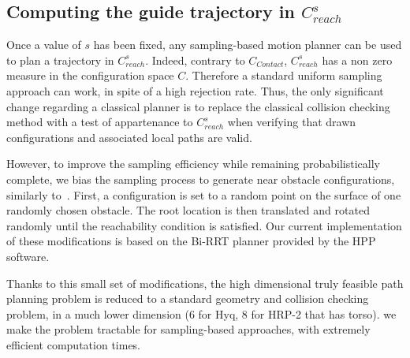 \subsection{Computing the guide trajectory in $C_{reach}^s$}
Once a value of $s$ has been fixed, any sampling-based motion planner can be used to plan a trajectory in $C_{reach}^s$. 
Indeed, contrary to $C_{Contact}$,  $C_{reach}^s$ has a non zero measure in the configuration space $C$. Therefore a standard uniform sampling approach
can work, in spite of a high rejection rate. 
Thus, the only significant change regarding a classical planner is to replace the classical collision checking method with a test of appartenance to $C_{reach}^s$ when verifying
that drawn configurations and associated local paths are valid.

However, to improve the sampling efficiency while remaining probabilistically complete, we bias the sampling process to generate near obstacle configurations, similarly to~\cite{Amato98choosinggood}.
First, a configuration is set to a random point on the surface of one randomly chosen obstacle. The root location is then translated and rotated randomly until the reachability condition is satisfied.
Our current implementation of these modifications is based on the Bi-RRT planner provided by the HPP software.

Thanks to this small set of modifications, the high dimensional truly feasible path planning problem is reduced to a standard geometry and collision checking problem, in a much lower dimension (6 for Hyq, 8 for HRP-2 that has  torso).  we make the problem tractable for sampling-based approaches, with extremely efficient computation times.
